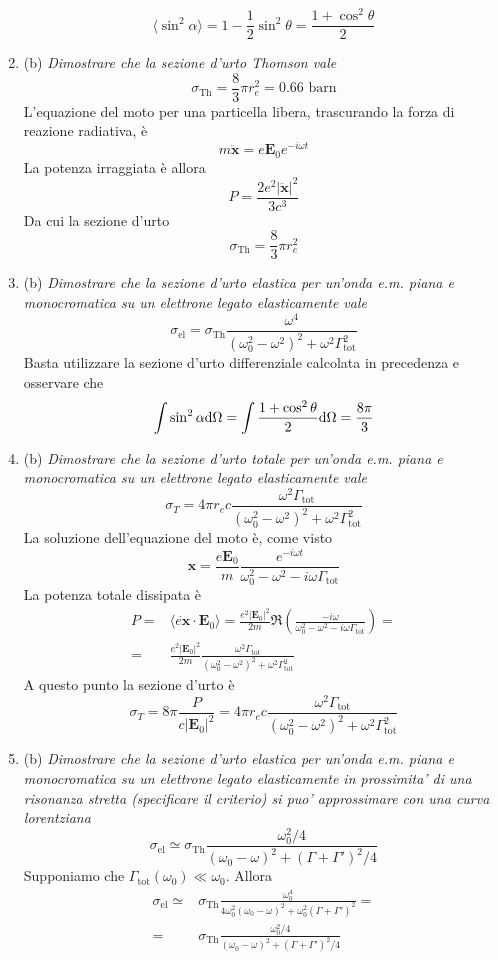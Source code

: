 \documentclass{article}
\renewcommand{\b}{(b)}
\renewcommand{\t}[1]{\textit{ #1}}
\renewcommand{\vec}[1]{\mathbf{#1}}
\begin{document}
\begin{enumerate}
\[\langle\sin^2\alpha\rangle=1-\frac{1}{2}\sin^2\theta=\frac{1+\cos^2\theta}{2}\]
\item\b\t{Dimostrare che la sezione d’urto Thomson vale \[\sigma_\mathrm{Th}= \frac{8}{3}\pi r_e^2 = 0.66\textrm{ barn}\]}L'equazione del moto per una particella libera, trascurando la forza di reazione radiativa, è
\[m\ddot{\vec{x}}=e\vec{E}_0e^{-i\omega t}\]
La potenza irraggiata è allora
\[P=\frac{2e^2|\ddot{\vec{x}}|^2}{3c^3}\]
Da cui la sezione d'urto
\[\sigma_\textrm{Th}=\frac{8}{3}\pi r_e^2\]
\item\b\t{Dimostrare che la sezione d’urto elastica per un’onda e.m. piana e monocromatica
	su un elettrone legato elasticamente vale \[\sigma_\mathrm{el}=\sigma_\mathrm{Th}\frac{\omega^4}{(\omega_0^2-\omega^2)^2+\omega^2\Gamma^2_\mathrm{tot}}\]}
Basta utilizzare la sezione d'urto differenziale calcolata in precedenza e osservare che
\[\int\sin^2\alpha\mathrm{d} \Omega=\int\frac{1+\cos^2\theta}{2}\mathrm{d}\Omega=\frac{8\pi}{3}\]
\item\b\t{Dimostrare che la sezione d’urto totale per un’onda e.m. piana e monocromatica
	su un elettrone legato elasticamente vale \[\sigma_{T} = 4\pi r_{e}c\frac{\omega^2\Gamma_\mathrm{tot}}{(\omega_0^2-\omega^2)^2+\omega^2\Gamma^2_\mathrm{tot}}\]}
La soluzione dell'equazione del moto è, come visto
\[\vec{x}=\frac{e\vec{E}_0}{m}\frac{e^{-i\omega t}}{\omega_0^2-\omega^2-i\omega\Gamma_\textrm{tot}}\]
La potenza totale dissipata è 
\begin{align*}P=&\langle\dot{e\vec{x}}\cdot\vec{E}_0\rangle=\frac{e^2|\vec{E}_0|^2}{2m}\Re\left(\frac{-i\omega}{\omega_0^2-\omega^2-i\omega\Gamma_\textrm{tot}}\right)=\\=&\frac{e^2|\vec{E}_0|^2}{2m}\frac{\omega^2\Gamma_\textrm{tot}}{(\omega_0^2-\omega^2)^2+\omega^2\Gamma^2_\textrm{tot}}\end{align*}
A questo punto la sezione d'urto è
\[\sigma_T=8\pi\frac{P}{c|\vec{E}_0|^2}=4\pi r_ec\frac{\omega^2\Gamma_\textrm{tot}}{(\omega_0^2-\omega^2)^2+\omega^2\Gamma^2_\textrm{tot}}\]
\item\b\t{Dimostrare che la sezione d’urto elastica per un’onda e.m. piana e monocromatica
	su un elettrone legato elasticamente in prossimita’ di una risonanza stretta
	(specificare il criterio) si puo’ approssimare con una curva lorentziana
	\[\sigma_\mathrm{el}\simeq \sigma_\mathrm{Th}\frac{\omega_0^2/4}{(\omega_0-\omega)^2+(\Gamma+\Gamma')^2/4}\]} Supponiamo che $\Gamma_\textrm{tot}(\omega_0)\ll\omega_0$. Allora 
\begin{align*}\sigma_\textrm{el}\simeq&\sigma_\textrm{Th}\frac{\omega_0^4}{4\omega_0^2(\omega_0-\omega)^2+\omega_0^2\left(\Gamma+\Gamma'\right)^2}=\\=&\sigma_\textrm{Th}\frac{\omega_0^2/4}{(\omega_0-\omega)^2+(\Gamma+\Gamma')^2/4}\end{align*}

\end{enumerate}
\end{document}
